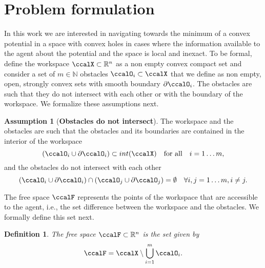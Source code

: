 \documentclass[article]{IEEEtran}
\newtheorem{definition}{Definition}
\theoremstyle{definition}
\newtheorem{assumption}{Assumption}
\begin{document}
\section{Problem formulation}\label{sec_problem_formulation}
%
In this work we are interested in navigating towards the minimum of a convex potential in a space with convex holes in cases where the information available to the agent about the potential and the space is local and inexact. To be formal, define the workspace $\ccalX \subset \mathbb{R}^n$ as a non empty convex compact set and consider a set of $m\in \mathbb{N}$ obstacles $\ccalO_i \subset \ccalX$  that we define as non empty, open, strongly convex sets with smooth boundary $\partial \ccalO_i$. The obstacles are such that they do not intersect with each other or with the boundary of the workspace. We formalize these assumptions next. 
%
%
\begin{assumption}[\bf Obstacles do not intersect]\label{as_obstacles}
The workspace and the obstacles are such that the obstacles and its boundaries are contained in the interior of the workspace
%
\begin{equation}
\left(\ccalO_i\cup \partial\ccalO_i \right)\subset int(\ccalX) \quad \mbox{for all} \quad i=1\ldots m,
\end{equation}
%
and the obstacles do not intersect with each other
%
\begin{equation}
\left(\ccalO_i\cup \partial\ccalO_i \right)\cap \left(\ccalO_j\cup \partial\ccalO_j \right)= \emptyset\quad  \forall i,j=1\ldots m, i\neq j.
\end{equation}
\end{assumption}
%
The free space $\ccalF$ represents the points of the workspace that are accessible to the agent, i.e., the set difference between the workspace and the obstacles. We formally define this set next.  
%
%
\begin{definition}\label{def_freespace}
The free space $\ccalF\subset \mathbb{R}^n$ is the set given by
%
\begin{equation}\label{eqn_freespace}
\ccalF = \ccalX \setminus \bigcup_{i=1}^m \ccalO_i.
\end{equation}
%
\end{definition}
\end{document}

